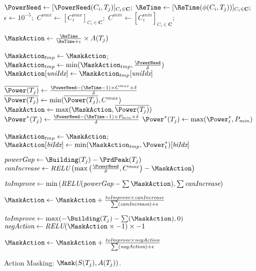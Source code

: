 \begin{algorithm}[ht]
\small
$\PowerNeed \gets [\PowerNeed(C_i, T_j)]_{C_i \in \mathbf{C}};$
$\ReTime \gets [\ReTime(\phi(C_i, T_j))]_{C_i \in \mathbf{C}};$
$\epsilon \gets 10^{-5};$
$C^{max} \gets [C^{max}_i]_{C_i \in \mathbf{C}};$
$C^{min} \gets [C^{min}_i]_{C_i \in \mathbf{C}};$

    $ \MaskAction \gets \frac{\ReTime}{\ReTime + \epsilon} \times A(T_j)$\;
    
    $ \MaskAction_{tmp} \gets \MaskAction$; 
    $\MaskAction_{tmp} \gets \min(\MaskAction_{tmp}, \frac{\PowerNeed}{\delta})$\;
    $ \MaskAction[\textit{uniIdx}] \gets \MaskAction_{tmp}[\textit{uniIdx}]$\;

    $\overline{\Power(T_j)} \gets \frac{ \PowerNeed- (\ReTime - 1) \times C^{max} \times \delta }{\delta}$\;
    $\overline{\Power(T_j)} \gets \min(\overline{\Power(T_j)}, C^{max})$\;
    $ \MaskAction \gets \max(\MaskAction, \overline{\Power(T_j)})$\;
    $\Power^*(T_j) \gets \frac{\PowerNeed- (\ReTime - 1) \times P_{min} \times \delta }{\delta}$\;
    $\Power^*(T_j) \gets \max(\Power^*_t, P_{min})$\;
    
    $\MaskAction_{tmp}\gets \MaskAction$; 
    $ \MaskAction[\textit{biIdx}] \gets \min(\MaskAction_{tmp}, \Power^*_t)[\textit{biIdx}]$\;

    $ \textit{powerGap} \gets \Building(T_j) - \PrdPeak(T_j)$\;
    $ \textit{canIncrease} \gets \textit{RELU}\left(\max\left(\frac{\PowerNeed}{\delta}, C^{max}\right) - \MaskAction \right)$\;
    
    $ \textit{toImprove} \gets \min\left(\textit{RELU}(\textit{powerGap} - \sum \MaskAction), \sum \textit{canIncrease}\right)$
    
    $ \MaskAction \gets \MaskAction + \frac{\textit{toImprove} \times \textit{canIncrease}}{\sum(\textit{canIncrease}) + \epsilon}$\;

    $ \textit{toImprove} \gets \max(-\Building(T_j) - \sum(\MaskAction), 0)$\;
    $ \textit{negAction} \gets \textit{RELU}(\MaskAction \times -1) \times -1$\;
    
    $ \MaskAction \gets \MaskAction +  \frac{\textit{toImprove} \times \textit{negAction}}{\sum(\textit{negAction}) + \epsilon}$\;

    \caption{Action Masking: $\Mask(S(T_j), A(T_j))$.} 
    \label{alg: action_masking}
\end{algorithm} 

